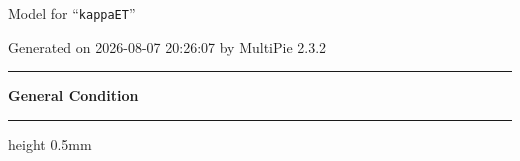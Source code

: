 \documentclass[fleqn,10pt,landscape]{jsarticle}
\begin{document}
\setcounter{MaxMatrixCols}{32}

\renewcommand{\tablename}{Table~}
\renewcommand{\figurename}{Figure~}
\setlength{\baselineskip}{16pt}
\setlength{\parindent}{0pt}
\setlength{\mathindent}{0pt}
\footnotesize
\begin{center}
\LARGE
Model for ``\texttt{kappaET}''
\end{center}
\begin{flushright}
Generated on 2026-08-07 20:26:07 by MultiPie 2.3.2
\end{flushright}
\setlength{\baselineskip}{16pt}
\footnotesize
\vspace{5mm}
\noindent \rule[0.5mm]{5mm}{0.5mm}\hspace{3mm}\textbf{General Condition}\hspace{3mm}\leaders\hrule height 0.5mm\hfill\kern0pt
\vspace{3mm}
\end{document}
